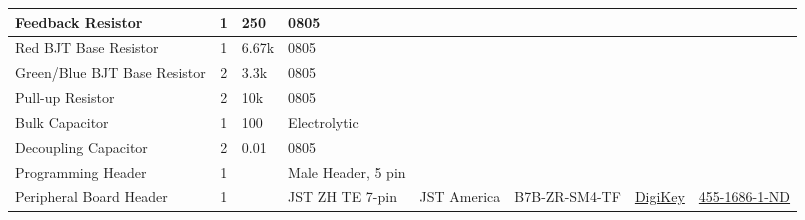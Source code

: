 \documentclass[12pt,letterpaper,onecolumn,landscape]{article}
\begin{document}
\begin{tabular}{ | p{4cm} | c | l | p{3cm} | p{4cm} | l | l | p{4cm} |}
	Feedback Resistor &
	1 & 				
	250\ohm & 		
	0805 & 		
	 & 		
	 & 
	 &
	
	\\ \hline

	Red BJT Base Resistor &
	1 & 				
	6.67k\ohm & 		
	0805 & 		
	 & 		
	 & 
	 &
	
	\\ \hline

	Green/Blue BJT Base Resistor &
	2 & 				
	3.3k\ohm & 		
	0805 & 		
	 & 		
	 & 
	 &
	
	\\ \hline
	
	Pull-up Resistor &
	2 & 				
	10k\ohm & 		
	0805 & 		
	 & 		
	 & 
	 &
	
	\\ \hline
	
	Bulk Capacitor &
	1 & 				
	100\uF & 		
	Electrolytic & 		
	 & 		
	 & 
	 &
	
	\\ \hline	
	
	Decoupling Capacitor &
	2 & 				
	0.01\uF & 		
	0805 & 		
	 & 		
	 & 
	 &
	
	\\ \hline
		
	Programming Header &
	1 & 				
	 & 		
	Male Header, 5 pin & 		
	 & 		
	 & 
	 &
	
	\\ \hline

	Peripheral Board Header &
	1 & 				
	 & 		
	JST ZH TE 7-pin & 		
	JST America &		
	B7B-ZR-SM4-TF & 
	\href{http://digikey.com}{DigiKey} & 
	\href{http://search.digikey.com/scripts/DkSearch/dksus.dll?Detail\&name=455-1686-1-ND}{455-1686-1-ND}
	\\ \hline


\end{tabular}
\end{document}

